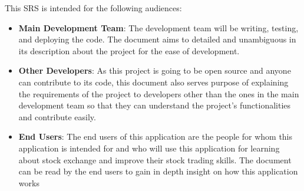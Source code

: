 \documentclass[12 pt, a4paper]{report}
\begin{document}
	This SRS is intended for the following audiences:
	\begin{itemize}
		\item \textbf{Main Development Team}: The development team will be writing, testing, and deploying the code. The document aims to detailed and unambiguous in its description about the project for the ease of development.
		\item \textbf{Other Developers}: As this project is going to be open source and anyone can contribute to its code, this document also serves purpose of explaining the requirements of the project to developers other than the ones in the main development team so that they can understand the project's functionalities and contribute easily.
		\item \textbf{End Users}: The end users of this application are the people for whom this application is intended for and who will use this application for learning about stock exchange and improve their stock trading skills. The document can be read by the end users to gain in depth insight on how this application works
	\end{itemize}
\end{document}
